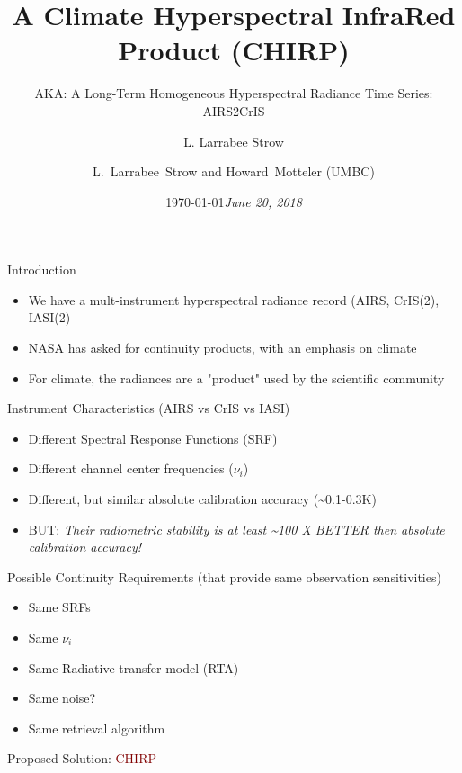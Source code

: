 \documentclass[10pt,t]{beamer}
\author{L. Larrabee Strow}
\date{\today}
\title{\large A Climate Hyperspectral InfraRed Product (CHIRP)}
\date{\textit{\footnotesize June 20, 2018}}
\subtitle{\footnotesize AKA:  A Long-Term Homogeneous Hyperspectral Radiance Time Series: AIRS2CrIS}
\author{L.~Larrabee~Strow and Howard~Motteler (UMBC)}
\begin{document}
\maketitle
{}

\begin{frame}[shrink=20,label={sec:orga86e1c0}]{Introduction}
\vspace{-0.1in}

\begin{itemize}
\item We have a mult-instrument hyperspectral radiance record (AIRS, CrIS(2), IASI(2)
\item NASA has asked for continuity products, with an emphasis on climate
\item For climate, the radiances are a "product" used by the scientific community
\end{itemize}
\begin{block}{Instrument Characteristics (AIRS vs CrIS vs IASI)}
\begin{itemize}
\item Different Spectral Response Functions (SRF)
\item Different channel center frequencies (\(\nu_i\))
\item Different, but similar absolute calibration accuracy (\textasciitilde{}0.1-0.3K)
\item BUT: \emph{Their radiometric stability is at least \textasciitilde{}100 X \alert{BETTER} then absolute calibration accuracy!}
\end{itemize}
\end{block}
\begin{block}{Possible Continuity Requirements (that provide same observation sensitivities)}
\begin{itemize}
\item Same SRFs
\item Same \(\nu_i\)
\item Same Radiative transfer model (RTA)
\item Same noise?
\item Same retrieval algorithm
\end{itemize}

\large Proposed Solution: \textcolor{maroon}{CHIRP}
\end{block}
\end{frame}
\end{document}
